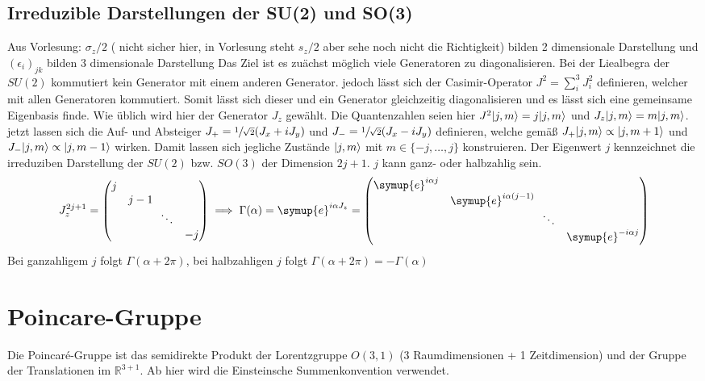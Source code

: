 \documentclass[
  captions=tableheading,  %
  titlepage=firstiscover, %
]{scrartcl}
\DeclarePairedDelimiter{\ket}{\lvert}{\rangle}
\begin{document}
\subsection{Irreduzible Darstellungen der SU(2) und SO(3)}
{\color{green} Aus Vorlesung: $\sigma_z/2$ ({\color{red} nicht sicher hier, in Vorlesung steht $s_z/2$ 
aber sehe noch nicht die Richtigkeit}) bilden 2 dimensionale Darstellung und $(\epsilon_i)_{jk}$ bilden 3 dimensionale Darstellung}
Das Ziel ist es zuächst möglich viele Generatoren zu diagonalisieren.
Bei der Liealbegra der $SU(2)$ kommutiert kein Generator mit einem anderen Generator.
jedoch lässt sich der Casimir-Operator $J^2 = \sum_i^3 J_i^2$ definieren,
welcher mit allen Generatoren kommutiert.
Somit lässt sich dieser und ein Generator gleichzeitig diagonalisieren und es lässt sich eine 
gemeinsame Eigenbasis finde. 
Wie üblich wird hier der Generator $J_z$ gewählt. 
Die Quantenzahlen seien hier $J^2 \ket{j,m} = j\ket{j,m}$ und $J_z \ket{j,m} = m \ket{j,m}$.
jetzt lassen sich die Auf- und Absteiger $J_+ = \sfrac{1}{\sqrt{2}}(J_x + iJ_y)$ und
$J_- = \sfrac{1}{\sqrt{2}} (J_x - i J_y)$ definieren, welche gemäß
$J_+ \ket{j,m} \propto \ket{j,m+1}$ und $J_-\ket{j,m} \propto \ket{j,m-1}$ wirken.
Damit lassen sich jegliche Zustände $\ket{j,m}$ mit $m \in \{-j,\ldots,j\}$ konstruieren.
Der Eigenwert $j$ kennzeichnet die irreduziben Darstellung der $SU(2)$ bzw. $SO(3)$ der 
Dimension $2j+1$.
$j$ kann ganz- oder halbzahlig sein.
\begin{equation*}
  J_z^{2j+1} = 
  \begin{pmatrix}
    j & & &  \\
    & j - 1 & & \\
    & & \! \!  \ddots & \\
    & & & -j
  \end{pmatrix}
  \implies \Gamma(\alpha) = \symup{e}^{i\alpha J_z} = 
  \begin{pmatrix}
    \symup{e}^{i\alpha j} & & &  \\
    & \symup{e}^{i\alpha (j-1)} & & \\
    & & \! \!  \ddots & \\
    & & & \symup{e}^{- i\alpha j}
  \end{pmatrix}
\end{equation*}
Bei ganzahligem $j$ folgt $\Gamma(\alpha +2\pi)$, bei halbzahligen $j$ folgt $\Gamma(\alpha + 2\pi) = - 
\Gamma(\alpha)$
\section{Poincare-Gruppe}
Die Poincaré-Gruppe ist das semidirekte Produkt der Lorentzgruppe 
$O(3,1)$ (3 Raumdimensionen + 1 Zeitdimension) und der Gruppe der Translationen im ${\mathbb {R}}^{{3+1}}$.
Ab hier wird die Einsteinsche Summenkonvention verwendet.
\end{document}
